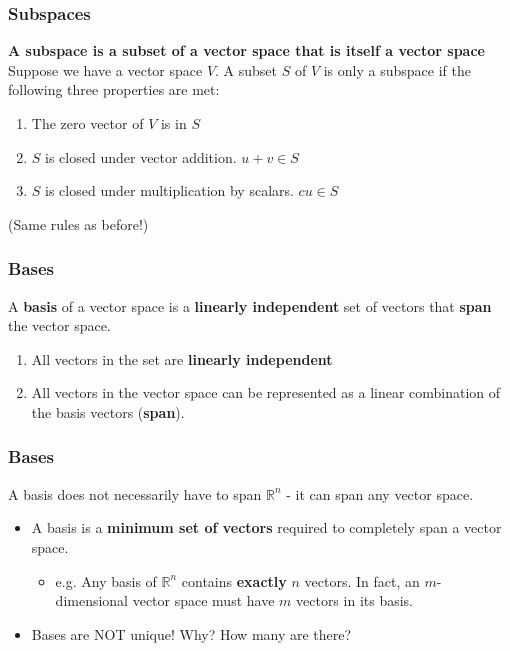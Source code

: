 \documentclass{beamer}
\begin{document}
\begin{frame}
    \frametitle{Subspaces}
    \textbf{A subspace is a subset of a vector space that is itself a vector space} \\
    Suppose we have a vector space $V$. A subset $S$ of $V$ is only a subspace if the following three properties are met: \\
    \begin{enumerate}
        \item The zero vector of $V$ is in $S$
        \item $S$ is closed under vector addition. $u + v \in S$
        \item $S$ is closed under multiplication by scalars. $cu \in S$
    \end{enumerate}
    (Same rules as before!)
\end{frame}

\begin{frame}
    \frametitle{Bases}
    A \textbf{basis} of a vector space is a \textbf{linearly independent} set of vectors that \textbf{span} the vector space.
    \begin{enumerate}
        \item All vectors in the set are \textbf{linearly independent}
        \item All vectors in the vector space can be represented as a linear combination of the basis vectors (\textbf{span}).
    \end{enumerate}
\end{frame}

\begin{frame}
    \frametitle{Bases}
    A basis does not necessarily have to span $\mathbb{R}^n$ - it can span any vector space.
    \begin{itemize}
        \item A basis is a \textbf{minimum set of vectors} required to completely span a vector space.
        \begin{itemize}
            \item e.g. Any basis of $\mathbb{R}^n$ contains \textbf{exactly} $n$ vectors. In fact, an $m$-dimensional vector space must have $m$ vectors in its basis.
        \end{itemize}
        \item Bases are NOT unique! Why? How many are there?
    \end{itemize}
\end{frame}
\end{document}
